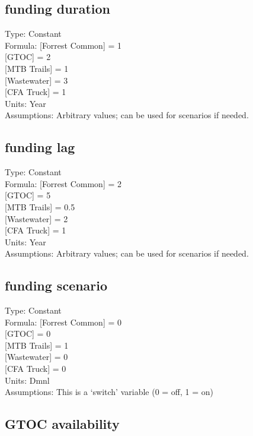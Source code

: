 \documentclass[
  11pt,
]{book}
\begin{document}
\hypertarget{funding-duration}{%
\subsection{funding duration}\label{funding-duration}}

Type: Constant\\
Formula: {[}Forrest Common{]} = 1\\
{[}GTOC{]} = 2\\
{[}MTB Trails{]} = 1\\
{[}Wastewater{]} = 3\\
{[}CFA Truck{]} = 1\\
Units: Year\\
Assumptions: Arbitrary values; can be used for scenarios if needed.

\hypertarget{funding-lag}{%
\subsection{funding lag}\label{funding-lag}}

Type: Constant\\
Formula: {[}Forrest Common{]} = 2\\
{[}GTOC{]} = 5\\
{[}MTB Trails{]} = 0.5\\
{[}Wastewater{]} = 2\\
{[}CFA Truck{]} = 1\\
Units: Year\\
Assumptions: Arbitrary values; can be used for scenarios if needed.

\hypertarget{funding-scenario}{%
\subsection{funding scenario}\label{funding-scenario}}

Type: Constant\\
Formula: {[}Forrest Common{]} = 0\\
{[}GTOC{]} = 0\\
{[}MTB Trails{]} = 1\\
{[}Wastewater{]} = 0\\
{[}CFA Truck{]} = 0\\
Units: Dmnl\\
Assumptions: This is a `switch' variable (0 = off, 1 = on)

\hypertarget{gtoc-availability}{%
\subsection{GTOC availability}\label{gtoc-availability}}
\end{document}
